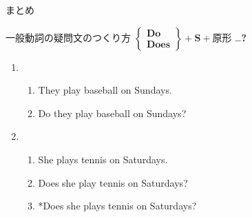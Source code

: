 \documentclass[aspectratio=169,xcolor={dvipsnames,table}]{beamer}
\begin{document}
\begin{frame}[plain]{まとめ}
\begin{block}{一般動詞の疑問文のつくり方}
$\left\{
\begin{array}{l}
 \textbf{Do}\\
 \textbf{Does}
\end{array}
\right\} + \textbf{S} + \textbf{原形}$ \ldots \textbf{?}
\end{block}

\begin{enumerate}
 \item \begin{enumerate}
	\item They play baseball on Sundays.
	\item Do they play baseball on Sundays?
       \end{enumerate}
 \item \begin{enumerate}
	\item She plays tennis on Saturdays.
	\item Does she play tennis on Saturdays? 
	\item *Does she plays tennis on Saturdays? 
       \end{enumerate}
\end{enumerate}

\end{frame}
\end{document}
